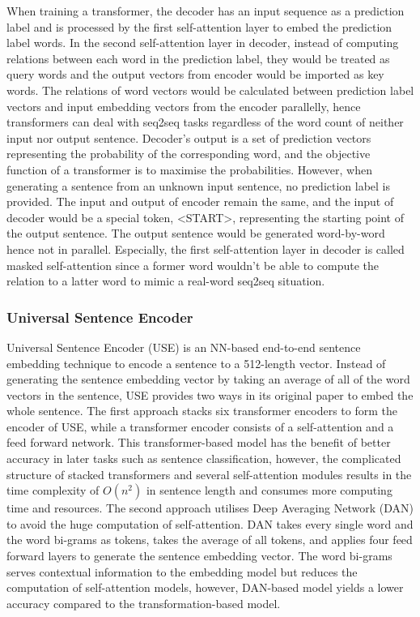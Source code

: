 When training a transformer, the decoder has an input sequence as a prediction label and is processed by the first self-attention layer to embed the prediction label words.
In the second self-attention layer in decoder, instead of computing relations between each word in the prediction label, they would be treated as query words and the output vectors from encoder would be imported as key words.
The relations of word vectors would be calculated between prediction label vectors and input embedding vectors from the encoder parallelly, hence transformers can deal with seq2seq tasks regardless of the word count of neither input nor output sentence.
Decoder's output is a set of prediction vectors representing the probability of the corresponding word, and the objective function of a transformer is to maximise the probabilities.
However, when generating a sentence from an unknown input sentence, no prediction label is provided.
The input and output of encoder remain the same, and the input of decoder would be a special token, <START>, representing the starting point of the output sentence.
The output sentence would be generated word-by-word hence not in parallel.
Especially, the first self-attention layer in decoder is called masked self-attention since a former word wouldn't be able to compute the relation to a latter word to mimic a real-word seq2seq situation.

\subsubsection{Universal Sentence Encoder}
Universal Sentence Encoder (USE) is an NN-based end-to-end sentence embedding technique to encode a sentence to a 512-length vector.
Instead of generating the sentence embedding vector by taking an average of all of the word vectors in the sentence, USE provides two ways in its original paper to embed the whole sentence.
The first approach stacks six transformer encoders to form the encoder of USE, while a transformer encoder consists of a self-attention and a feed forward network.
This transformer-based model has the benefit of better accuracy in later tasks such as sentence classification, however, the complicated structure of stacked transformers and several self-attention modules results in the time complexity of $O(n^2)$ in sentence length and consumes more computing time and resources.
The second approach utilises Deep Averaging Network (DAN) to avoid the huge computation of self-attention.
DAN takes every single word and the word bi-grams as tokens, takes the average of all tokens, and applies four feed forward layers to generate the sentence embedding vector.
The word bi-grams serves contextual information to the embedding model but reduces the computation of self-attention models, however, DAN-based model yields a lower accuracy compared to the transformation-based model.

